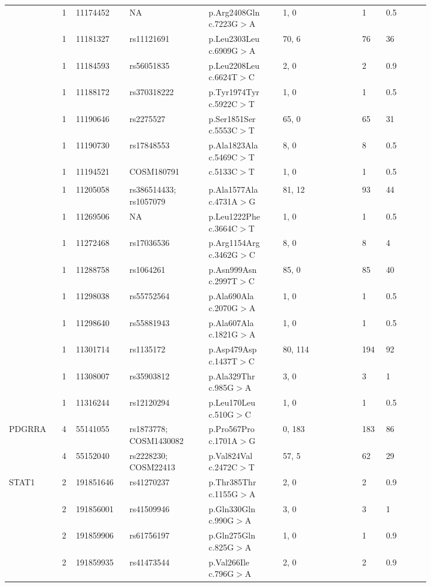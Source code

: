 \begin{longtable}{p{0.1\linewidth}|p{0.02\linewidth}p{0.1\linewidth}p{0.16\linewidth}p{0.15\linewidth}p{0.16\linewidth}p{0.04\linewidth}p{0.09\linewidth}}
		& 1 & 11174452 & NA & p.Arg2408Gln c.7223G$>$A & 1, 0 & 1 & 0.5
		\\
		& 1 & 11181327 & rs11121691 & p.Leu2303Leu c.6909G$>$A & 70, 6 & 76 & 36
		\\
		& 1 & 11184593 & rs56051835 & p.Leu2208Leu c.6624T$>$C & 2, 0 & 2 & 0.9
		\\
		& 1 & 11188172 & rs370318222 & p.Tyr1974Tyr c.5922C$>$T & 1, 0 & 1 & 0.5
		\\
		& 1 & 11190646 & rs2275527 & p.Ser1851Ser c.5553C$>$T & 65, 0 & 65 & 31
		\\
		& 1 & 11190730 & rs17848553 & p.Ala1823Ala c.5469C$>$T & 8, 0 & 8 & 0.5
		\\
		& 1 & 11194521 & COSM180791 & c.5133C$>$T & 1, 0 & 1 & 0.5
		\\
		\\
		& 1 & 11205058 & rs386514433; rs1057079 & p.Ala1577Ala c.4731A$>$G & 81, 12 & 93 & 44
		\\
		& 1 & 11269506 & NA & p.Leu1222Phe c.3664C$>$T & 1, 0 & 1 & 0.5
		\\
		& 1 & 11272468 & rs17036536 & p.Arg1154Arg c.3462G$>$C & 8, 0 & 8 & 4
		\\
		& 1 & 11288758 & rs1064261 & p.Asn999Asn c.2997T$>$C & 85, 0 & 85 & 40
		\\
		& 1 & 11298038 & rs55752564 & p.Ala690Ala c.2070G$>$A & 1, 0 & 1 & 0.5
		\\
		& 1 & 11298640 & rs55881943 & p.Ala607Ala c.1821G$>$A & 1, 0 & 1 & 0.5
		\\
		& 1 & 11301714 & rs1135172 & p.Asp479Asp c.1437T$>$C & 80, 114 & 194 & 92
		\\
		& 1 & 11308007 & rs35903812 & p.Ala329Thr c.985G$>$A & 3, 0 & 3 & 1
		\\
		& 1 & 11316244 & rs12120294 & p.Leu170Leu c.510G$>$C & 1, 0 & 1 & 0.5
		\\
		\hline
		PDGRRA & 4 & 55141055 & rs1873778; COSM1430082 & p.Pro567Pro c.1701A$>$G & 0, 183 & 183 & 86
		\\
		& 4 & 55152040 & rs2228230; COSM22413 & p.Val824Val c.2472C$>$T & 57, 5 & 62 & 29
		\\
		\hline
		STAT1 & 2 & 191851646 & rs41270237 & p.Thr385Thr c.1155G$>$A & 2, 0 & 2 & 0.9
		\\
		& 2 & 191856001 & rs41509946 & p.Gln330Gln c.990G$>$A & 3, 0 & 3 & 1
		\\
		& 2 & 191859906 & rs61756197 & p.Gln275Gln c.825G$>$A & 1, 0 & 1 & 0.9
		\\
		& 2 & 191859935 & rs41473544 & p.Val266Ile c.796G$>$A & 2, 0 & 2 & 0.9

\end{longtable}
